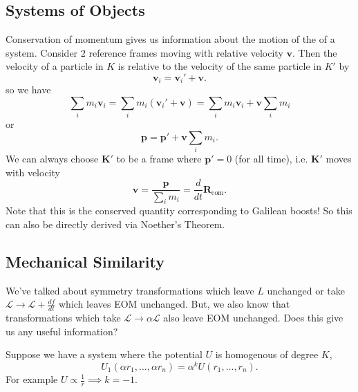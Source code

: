 \documentclass{article}
\numberwithin{equation}{section}
\begin{document}
\subsection{Systems of Objects}
Conservation of momentum gives us information about the motion of the  of a system. Consider $2$ reference frames moving with relative velocity $\bm{v}.$ Then the velocity of a particle in $K$ is relative to the velocity of the same particle in $K'$ by
\begin{equation}
    \bm{v}_i = \bm{v}_i' + \bm{v}.
\end{equation}
so we have 
\begin{equation}
    \sum_i m_i\bm{v}_i = \sum_i m_i(\bm{v}_i' + \bm{v}) = \sum_i m_i\bm{v}_i + \bm{v}\sum_i m_i
\end{equation}
or 
\begin{equation}
    \bm{p} = \bm{p}' + \bm{v}\sum_i m_i.
\end{equation}
We can always choose $\bm{K}'$ to be a frame where $\bm{p}'=0$ (for all time), i.e. $\bm{K}'$ moves with velocity
\begin{equation}
    \bm{v} = \frac{\bm{p}}{\sum_i m_i} = \frac{d}{dt} \bm{R}_\text{com}.
\end{equation}
Note that this is the conserved quantity corresponding to Galilean boosts! So this can also be directly derived via Noether's Theorem.
\subsection{Mechanical Similarity}
We've talked about symmetry transformations which leave $L$ unchanged or take $\mathcal{L} \to \mathcal{L} + \frac{df}{dt}$ which leaves EOM unchanged. But, we also know that transformations which take $\mathcal{L} \to \alpha \mathcal{L}$ also leave EOM unchanged. Does this give us any useful information?

Suppose we have a system where the potential $U$ is homogenous of degree $K$,
\begin{equation}
    U_1(\alpha r_1, \dots, \alpha r_n) = \alpha^k U(r_1,\dots,r_n).
\end{equation}
For example $U \propto \frac{1}{r} \implies k = -1.$
\end{document}
